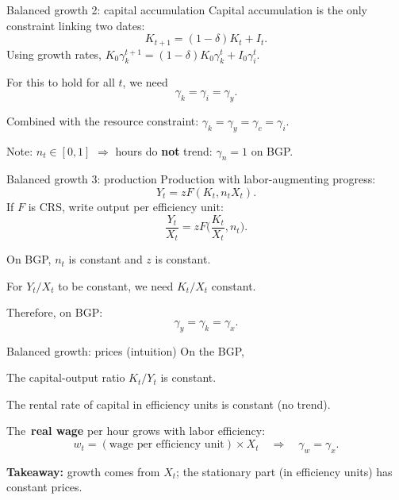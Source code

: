 \documentclass[aspectratio=169,xcolor=dvipsnames]{beamer}
\let\tempone\itemize
\let\temptwo\enditemize
\renewenvironment{itemize}{\tempone\addtolength{\itemsep}{\fill}}{\temptwo}
\begin{document}
\begin{frame}{Balanced growth 2: capital accumulation}
\label{slide:BC_BGP_Kacc}
\small
Capital accumulation is the only constraint linking two dates:
\[
K_{t+1} = (1-\delta)K_t + I_t.
\]
Using growth rates, \(K_0\gamma_k^{t+1} = (1-\delta)K_0\gamma_k^t + I_0\gamma_i^t\).

\vspace{0.4em}
\begin{itemize}
    \item For this to hold for all \(t\), we need
    \[
        \gamma_k = \gamma_i = \gamma_y.
    \]
    \item Combined with the resource constraint: \(\gamma_k=\gamma_y=\gamma_c=\gamma_i\).
    \item Note: \(n_t\in[0,1]\) \(\Rightarrow\) hours do \textbf{not} trend: \(\gamma_n=1\) on BGP.
\end{itemize}
\end{frame}

\begin{frame}{Balanced growth 3: production}
\label{slide:BC_BGP_Prod}
\small
Production with labor-augmenting progress:
\[
Y_t = z F(K_t,n_t X_t).
\]
If \(F\) is CRS, write output per efficiency unit:
\[
\frac{Y_t}{X_t} = z F\Big(\frac{K_t}{X_t}, n_t\Big).
\]
\begin{itemize}
    \item On BGP, \(n_t\) is constant and \(z\) is constant.
    \item For \(Y_t/X_t\) to be constant, we need \(K_t/X_t\) constant.
    \item Therefore, on BGP:
    \[
        \gamma_y = \gamma_k = \gamma_x.
    \]
\end{itemize}
\end{frame}

\begin{frame}{Balanced growth: prices (intuition)}
\label{slide:BC_BGP_Prices}
\small
On the BGP,
\begin{itemize}
    \item The capital-output ratio \(K_t/Y_t\) is constant.
    \item The rental rate of capital in efficiency units is constant (no trend).
    \item The \,\textbf{real wage} per hour grows with labor efficiency:
    \[
        w_t = (\text{wage per efficiency unit})\times X_t
        \quad\Rightarrow\quad
        \gamma_w = \gamma_x.
    \]
\end{itemize}

\vspace{0.4em}
\textbf{Takeaway:} growth comes from \(X_t\); the stationary part (in efficiency units) has constant prices.
\end{frame}
\end{document}
